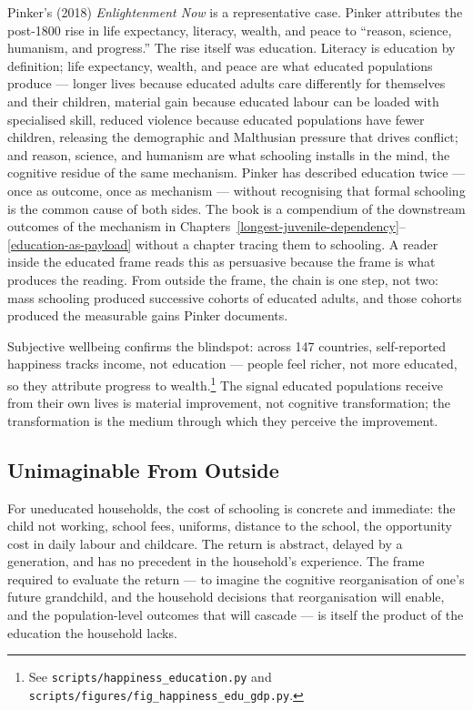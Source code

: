 \documentclass[12pt,letterpaper]{article}
\begin{document}
Pinker's (2018) \emph{Enlightenment Now} is a representative case.
Pinker attributes the post-1800 rise in life expectancy, literacy,
wealth, and peace to ``reason, science, humanism, and progress.'' The
rise itself was education. Literacy is education by definition; life
expectancy, wealth, and peace are what educated populations produce ---
longer lives because educated adults care differently for themselves
and their children, material gain because educated labour can be loaded
with specialised skill, reduced violence because educated populations
have fewer children, releasing the demographic and Malthusian
pressure that drives conflict; and reason, science, and humanism
are what schooling installs in the mind, the cognitive residue
of the same mechanism. Pinker has described education twice --- once
as outcome, once as mechanism --- without recognising that formal
schooling is the common cause of both sides. The book is a compendium
of the downstream outcomes of the mechanism in
Chapters~\ref{longest-juvenile-dependency}--\ref{education-as-payload}
without a chapter tracing them to schooling. A reader inside the
educated frame reads this as persuasive because the frame is what
produces the reading. From outside the frame, the chain is one step,
not two: mass schooling produced successive cohorts of educated adults,
and those cohorts produced the measurable gains Pinker documents.

Subjective wellbeing confirms the blindspot: across 147 countries,
self-reported happiness tracks income, not education --- people feel
richer, not more educated, so they attribute progress to
wealth.\footnote{See \nolinkurl{scripts/happiness_education.py} and
\nolinkurl{scripts/figures/fig_happiness_edu_gdp.py}.} The signal
educated populations receive from their own lives is material
improvement, not cognitive transformation; the transformation is the
medium through which they perceive the improvement.

\subsection{Unimaginable From Outside}\label{unimaginable-from-outside}

For uneducated households, the cost of schooling is concrete and
immediate: the child not working, school fees, uniforms, distance to
the school, the opportunity cost in daily labour and childcare. The
return is abstract, delayed by a generation, and has no precedent in
the household's experience. The frame required to evaluate the
return --- to imagine the cognitive reorganisation of one's future
grandchild, and the household decisions that reorganisation will
enable, and the population-level outcomes that will cascade --- is
itself the product of the education the household lacks.
\end{document}
